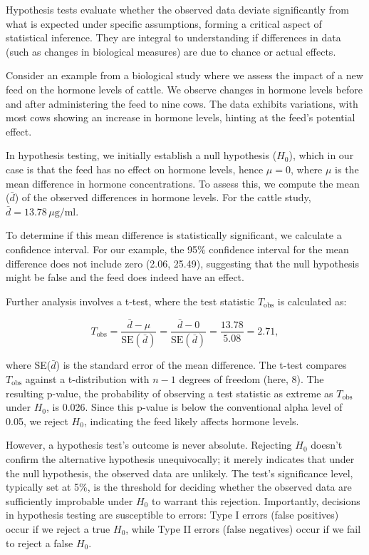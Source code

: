 \documentclass{article}
\begin{document}
Hypothesis tests evaluate whether the observed data deviate significantly from what is expected under specific assumptions, forming a critical aspect of statistical inference. They are integral to understanding if differences in data (such as changes in biological measures) are due to chance or actual effects.

Consider an example from a biological study where we assess the impact of a new feed on the hormone levels of cattle. We observe changes in hormone levels before and after administering the feed to nine cows. The data exhibits variations, with most cows showing an increase in hormone levels, hinting at the feed's potential effect.

In hypothesis testing, we initially establish a null hypothesis ($H_0$), which in our case is that the feed has no effect on hormone levels, hence $\mu = 0$, where $\mu$ is the mean difference in hormone concentrations. To assess this, we compute the mean ($\bar{d}$) of the observed differences in hormone levels. For the cattle study, $\bar{d} = 13.78\, \mu \mathrm{g/ml}$.

To determine if this mean difference is statistically significant, we calculate a confidence interval. For our example, the 95\% confidence interval for the mean difference does not include zero (2.06, 25.49), suggesting that the null hypothesis might be false and the feed does indeed have an effect.

Further analysis involves a t-test, where the test statistic $T_{\text{obs}}$ is calculated as:

\[
T_{\text{obs}} = \frac{\bar{d} - \mu}{\text{SE}(\bar{d})} = \frac{\bar{d} - 0}{\text{SE}(\bar{d})} = \frac{13.78}{5.08} = 2.71,
\]

where SE($\bar{d}$) is the standard error of the mean difference. The t-test compares $T_{\text{obs}}$ against a t-distribution with $n-1$ degrees of freedom (here, 8). The resulting p-value, the probability of observing a test statistic as extreme as $T_{\text{obs}}$ under $H_0$, is 0.026. Since this p-value is below the conventional alpha level of 0.05, we reject $H_0$, indicating the feed likely affects hormone levels.

However, a hypothesis test's outcome is never absolute. Rejecting $H_0$ doesn't confirm the alternative hypothesis unequivocally; it merely indicates that under the null hypothesis, the observed data are unlikely. The test's significance level, typically set at 5\%, is the threshold for deciding whether the observed data are sufficiently improbable under $H_0$ to warrant this rejection. Importantly, decisions in hypothesis testing are susceptible to errors: Type I errors (false positives) occur if we reject a true $H_0$, while Type II errors (false negatives) occur if we fail to reject a false $H_0$.
\end{document}
